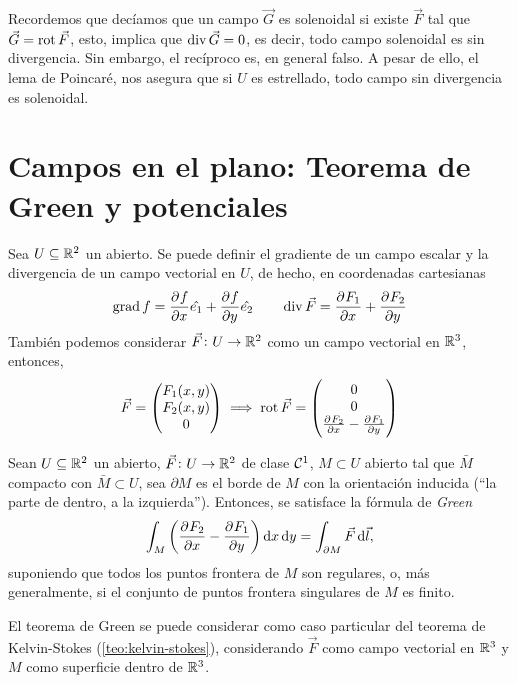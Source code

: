 Recordemos que decíamos que un campo $\vec{G}$ es solenoidal si existe $\vec{F}$ tal que $\vec{G} = \operatorname{rot} \vec{F}$, esto, implica
que $\operatorname{div} \vec{G} = 0$, es decir, todo campo solenoidal es sin divergencia. Sin embargo, el recíproco es, en general falso. A pesar de
ello, el lema de Poincar\'e, nos asegura que si $U$ es estrellado, todo campo sin divergencia es solenoidal.

\section{Campos en el plano: Teorema de Green y potenciales}

\begin{defi}
    Sea $U \subseteq \mathbb{R}^2$ un abierto. Se puede definir el gradiente de un campo escalar y la divergencia de un campo
    vectorial en $U$, de hecho, en coordenadas cartesianas
    \[
        \operatorname{grad} f = \frac{\partial^{} f}{\partial x^{}} \hat{e_1} + \frac{\partial^{} f}{\partial y^{}} \hat{e_2} \qquad
        \operatorname{div} \vec{F} = \frac{\partial^{} F_1}{\partial x^{}} + \frac{\partial^{} F_2}{\partial y^{}}
    \]
    También podemos considerar $\vec{F} \colon U \to \mathbb{R}^2$ como un campo vectorial en $\mathbb{R}^3$, entonces,
    \[
        \vec{F} = 
        \begin{pmatrix}
            F_1(x,y) \\ F_2(x,y) \\ 0
        \end{pmatrix} \implies
        \operatorname{rot} \vec{F} =
        \begin{pmatrix}
            0 \\ 0 \\ \frac{\partial^{} F_2}{\partial x^{}} - \frac{\partial^{} F_1}{\partial y^{}}
        \end{pmatrix}
    \]
\end{defi}

\begin{teo}[de Green]
    Sean $U \subseteq \mathbb{R}^2$ un abierto, $\vec{F} \colon U \to \mathbb{R}^2$ de clase $\mathcal{C}^1$, $M \subset U$ abierto tal que
    $\bar{M}$ compacto con $\bar{M} \subset U$, sea $\partial M$ es el borde de $M$ con la orientación inducida (``la parte de dentro,
    a la izquierda''). Entonces, se satisface la fórmula de \emph{Green}
    \[
        \int_M \left( \pdv{F_2}{x} - \pdv{F_1}{y} \right) \dif x \dif y = \int_{\partial M} \vec{F} \dif \vec{l},
    \]
    suponiendo que todos los puntos frontera de $M$ son regulares, o, más generalmente, si el conjunto de puntos frontera singulares
    de $M$ es finito.
\end{teo}

\begin{obs}
    El teorema de Green se puede considerar como caso particular del teorema de Kelvin-Stokes (\ref{teo:kelvin-stokes}), considerando $\vec{F}$
    como campo vectorial en $\mathbb{R}^3$ y $M$ como superficie dentro de $\mathbb{R}^3$.
\end{obs}

